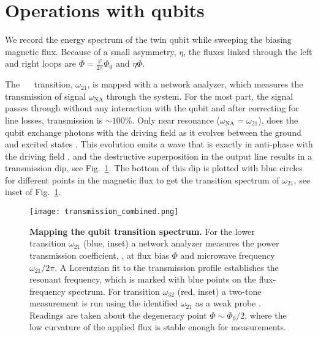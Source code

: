 
\section{Operations with qubits}
\label{sec:characterisation}



\noindent We record  the energy spectrum of  the twin qubit
while  sweeping the  biasing magnetic  flux.  Because  of a
small asymmetry,  $\eta$, the  fluxes linked through  the left
and right loops are $ \Phi = \frac{\varphi}{2\pi}\Phi_0$ and $ \eta\Phi $.

The ~\ilra~ transition, $\omega_{21}$, is mapped
with a network analyzer, which measures the transmission of
signal $\omega_{\text{NA}}$  through the  system.  For  the most
part,  the signal  passes through  without any  interaction
with  the  qubit  and  after correcting  for  line  losses,
transmission  is   $  \sim  100\%  $.    Only  near  resonance
($\omega_{\text{NA}}=\omega_{21}$), does  the qubit  exchange photons
with the driving field as it evolves between the ground and
excited  states \cite{rabi}.  This evolution  emits a  wave
that  is  exactly  in  anti-phase with  the  driving  field
\cite{abdumalikov2010},  and the  destructive superposition
in  the output  line  results in  a  transmission dip,  see
Fig.~\ref{fig:transmission}.  The  bottom  of this  dip  is
plotted  with  blue circles  for  different  points in  the
magnetic   flux  to   get   the   transition  spectrum   of
$\omega_{21}$, see inset of Fig.~\ref{fig:transmission}.

\begin{figure}[h]
  \centering            \texttt{[image: transmission\_combined.png]}
  \caption{\small  \textbf{Mapping   the  qubit  transition
      spectrum.}   For the  lower transition  $\omega_{21}$
    (blue,  inset) a  network analyzer  measures the  power
    transmission coefficient, , at flux bias
    $ \Phi $ and microwave frequency $ \omega_{21}/2\pi$. A
    Lorentzian fit \cite{Astafiev2010}  to the transmission
    profile  establishes the  resonant frequency,  which is
    marked with blue points on the flux-frequency spectrum.
    For  transition $\omega_{32}$  (red, inset)  a two-tone
    measurement is  run using the  identified $\omega_{21}$
    as  a  weak  probe  .  Readings  are  taken  about  the
    degeneracy point  $ \Phi  \sim \Phi_{0}/2 $,  where the
    low curvature of the applied  flux is stable enough for
    measurements.}
  \label{fig:transmission}
\end{figure}

